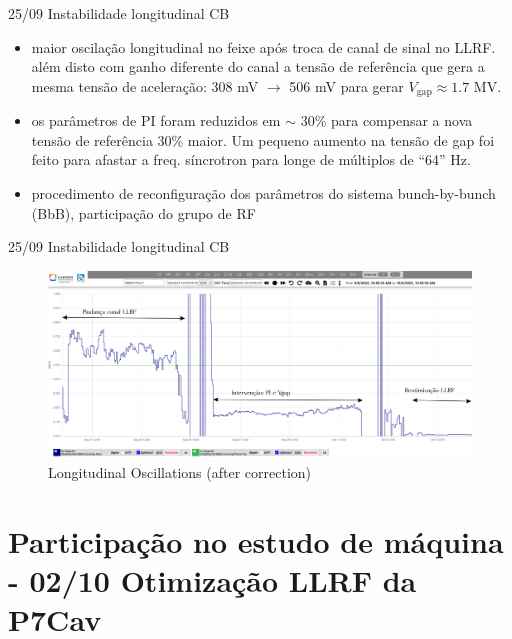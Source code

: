 \documentclass{beamer}					%
\begin{document}
\begin{frame}{25/09 Instabilidade longitudinal CB}
    \begin{itemize}
        \item maior oscilação longitudinal no feixe após troca de canal de sinal no LLRF. além disto com ganho diferente do canal a tensão de referência que gera a mesma tensão de aceleração: 308 mV $\rightarrow$ 506 mV para gerar $V_\mathrm{gap} \approx 1.7$ MV.
        \item os parâmetros de PI foram reduzidos em $\sim$ 30\% para compensar a nova tensão de referência 30\% maior. Um pequeno aumento na tensão de gap foi feito para afastar a freq. síncrotron para longe de múltiplos de ``64'' Hz.
        \item procedimento de reconfiguração dos parâmetros do sistema bunch-by-bunch (BbB), participação do grupo de RF
	\end{itemize}
\end{frame}



\begin{frame}{25/09 Instabilidade longitudinal CB}

    \begin{figure}[H]
		\centering
        \includegraphics[width=.9\textwidth]{figures/long-osc-after-correction.png}
        \caption{Longitudinal Oscillations (after correction)}
        \label{fig:figure1}
    \end{figure}
    
\end{frame}

\section{Participação no estudo de máquina - 02/10 Otimização LLRF da P7Cav}
\end{document}
